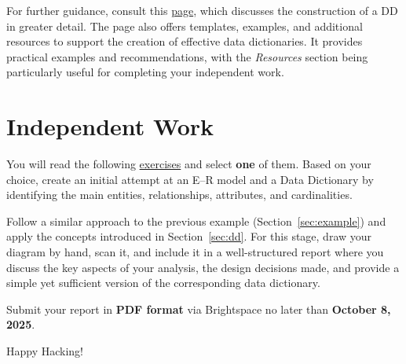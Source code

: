 \documentclass{article}
\begin{document}
For further guidance, consult this \href{https://datamanagement.hms.harvard.edu/collect-analyze/documentation-metadata/data-dictionary}{page}, which discusses the construction of a DD in greater detail. The page also offers templates, examples, and additional resources to support the creation of effective data dictionaries.  It provides practical examples and recommendations, with the \emph{Resources} section being particularly useful for
completing your independent work.


\section{Independent Work}
You will read the following \href{https://drive.google.com/file/d/1TOvNSZZsybj1skLCpOxLtpr8b5A3Zb_6/view?usp=sharing}{exercises} and select \textbf{one} of them. Based on your choice, create an initial attempt at an E--R model and a Data Dictionary by identifying the main entities, relationships, attributes, and cardinalities.

Follow a similar approach to the previous example (Section~\ref{sec:example}) and apply the concepts introduced in Section~\ref{sec:dd}. For this stage, draw your diagram by hand, scan it, and include it in a well-structured report where you discuss the key aspects of your analysis, the design decisions made, and provide a simple yet sufficient version of the corresponding data dictionary.

Submit your report in \textbf{PDF format} via Brightspace\texttrademark{} no later than
\textbf{October 8, 2025}.


\vspace{5mm}
Happy Hacking! 
\end{document}
